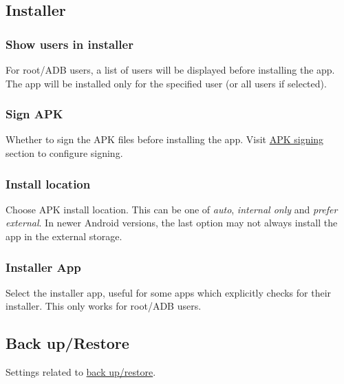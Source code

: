 \subsection{Installer}\label{subsec:installer} %

\subsubsection{Show users in installer} %
For root/ADB users, a list of users will be displayed before installing the app.
The app will be installed only for the specified user (or all users if selected).

\subsubsection{Sign APK} %
Whether to sign the APK files before installing the app.
Visit \hyperref[subsec:apk-signing]{APK signing} section to configure signing.

\subsubsection{Install location} %
Choose APK install location.
This can be one of \textit{auto}, \textit{internal only} and \textit{prefer external}.
In newer Android versions, the last option may not always install the app in the external storage.

\subsubsection{Installer App} %
Select the installer app, useful for some apps which explicitly checks for their installer.
This only works for root/ADB users.

\subsection{Back up/Restore}\label{subsec:backup/restore} %
Settings related to \hyperref[sec:backup-restore]{back up/restore}.


